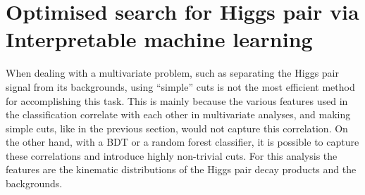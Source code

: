 \section{Optimised search for Higgs pair via Interpretable machine learning \label{sec:mlanalysisly}}
\par When dealing with a multivariate problem, such as separating the Higgs pair signal from its backgrounds, using ``simple'' cuts is not the most efficient method for accomplishing this task. This is mainly because the various features used in the classification correlate with each other in multivariate analyses, and making simple cuts, like in the previous section, would not capture this correlation.  On the other hand,  with a BDT or a random forest classifier, it is possible to capture these correlations and introduce highly non-trivial cuts.  For this analysis the features are the kinematic distributions of the Higgs pair decay products and the backgrounds.
